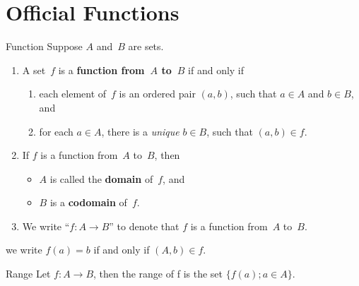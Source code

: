 \documentclass[../MATH-2000-Notes.tex]{subfiles}
\begin{document}
\section{Official Functions}
\begin{Definition}
    {Function}
    Suppose $A$ and~$B$ are sets.
    \begin{enumerate}
        \item \label{FunctionDefn-func}
              A set~$f$ is a
              \textbf{function from~$A$ to~$B$} if and only if
              \begin{enumerate}
                  \item \label{FunctionDefn-func-pair}
                        each element of~$f$ is an ordered pair $(a,b)$, such that $a \in A$ and $b \in B$,
                        and
                  \item \label{FunctionDefn-func-unique}
                        for each $a \in A$, there is a \emph{unique} $b \in B$, such that $(a,b) \in f$.
              \end{enumerate}
        \item If $f$ is a function from~$A$ to~$B$, then
              \begin{itemize}
                  \item $A$ is called the \textbf{domain} of~$f$,
                        and
                  \item $B$ is a \textbf{codomain} of~$f$.
              \end{itemize}
        \item We write ``$f \colon A \to B$''%
              to denote that $f$ is a function from~$A$ to~$B$.
    \end{enumerate}

\end{Definition}
\begin{Note}
    we write \(f(a) = b\) if and only if \((A,b)\in f\).
\end{Note}
\begin{Definition}
    {Range}
    Let \(f:A\rightarrow B\), then the range of f is the set \(\{f(a);a\in A\}\).
\end{Definition}
\end{document}
